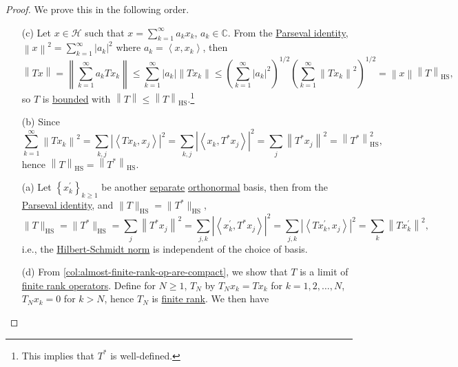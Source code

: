 \begin{proof}
	We prove this in the following order.
	\begin{enumerate}
		\item[(c)] Let \(x\in \mathcal{H} \) such that \(x = \sum_{k=1}^{\infty} a_{k} x_{k} \), \(a_{k} \in \mathbb{C} \). From the \hyperref[col:Parseval]{Parseval identity}, \(\left\lVert x\right\rVert ^{2} = \sum_{k=1}^{\infty}\left\vert a_{k}  \right\vert ^{2} \) where \(a_{k} = \left\langle x, x_{k}  \right\rangle \), then
			\[
				\left\lVert Tx\right\rVert
				= \left\lVert \sum_{k=1}^{\infty} a_{k} Tx_{k} \right\rVert
				\leq \sum_{k=1}^{\infty} \left\vert a_{k}  \right\vert \left\lVert T x_{k} \right\rVert
				\leq \left( \sum_{k=1}^{\infty} \left\vert a_{k} \right\vert ^2 \right) ^{1 / 2} \left( \sum_{k=1}^{\infty} \left\lVert T x_{k} \right\rVert ^{2} \right) ^{1 / 2}
				= \left\lVert x\right\rVert \left\lVert T\right\rVert _{\mathrm{HS}},
			\]
			so \(T\) is \hyperref[def:bounded-linear-op]{bounded} with \(\left\lVert T\right\rVert \leq \left\lVert T\right\rVert _{\mathrm{HS} }\).\footnote{This implies that \(T^{\ast} \) is well-defined.}
		\item[(b)] Since
			\[
				\sum_{k=1}^{\infty} \left\lVert Tx_{k} \right\rVert ^{2}
				= \sum_{k, j} \left\vert \left\langle  T x_{k} , x_{j} \right\rangle \right\vert ^{2}
				= \sum_{k, j} \left\vert \left\langle x_{k} , T^{\ast} x_{j}  \right\rangle  \right\vert ^{2}
				= \sum_{j} \left\lVert T^{\ast} x_{j} \right\rVert ^{2}
				= \left\lVert T^{\ast} \right\rVert ^{2} _{\mathrm{HS} },
			\]
			hence \(\left\lVert T\right\rVert _{\mathrm{HS} } = \left\lVert T^{\ast} \right\rVert _{\mathrm{HS} }\).
		\item[(a)] Let \(\left\{ x^\prime _k \right\}_{k\geq 1} \) be another \hyperref[def:separable]{separate} \hyperref[def:orthonormal-system]{orthonormal} basis, then from the \hyperref[col:Parseval]{Parseval identity}, and \(\lVert T \rVert _{\mathrm{HS} }= \lVert T^{\ast}  \rVert_{\mathrm{HS}}\),
			\[
				\lVert T \rVert _{\mathrm{HS} }
				= \lVert T^{\ast}  \rVert_{\mathrm{HS} }
				= \sum_{j} \left\lVert T^{\ast} x_{j} \right\rVert ^{2}
				= \sum_{j, k} \left\vert \left\langle x^\prime _{k} , T^{\ast} x_{j}  \right\rangle  \right\vert ^{2}
				= \sum_{j, k} \left\vert \left\langle T x^\prime _{k} , x_{j}  \right\rangle  \right\vert ^{2}
				= \sum_{k} \left\lVert T x^\prime _{k} \right\rVert ^{2},
			\]
			i.e., the \hyperref[def:Hilbert-Schmidt-norm]{Hilbert-Schmidt norm} is independent of the choice of basis.
		\item[(d)] From \autoref{col:almost-finite-rank-op-are-compact}, we show that \(T\) is a limit of \hyperref[rmk:finite-rank-op]{finite rank operators}. Define for \(N \geq 1\), \(T_N\) by \(T_N x_k = Tx_k\) for \(k = 1, 2, \ldots  , N\), \(T_{N}x_k = 0 \) for \(k > N\), hence \(T_N\) is \hyperref[rmk:finite-rank-op]{finite rank}. We then have

\end{enumerate}
\end{proof}
